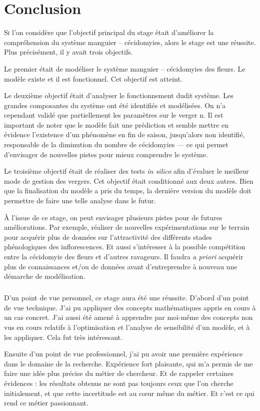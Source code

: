 \chapter{Conclusion} 

\lettrine{S}{i} l'on considère que l'objectif principal du stage était d'améliorer la compréhension du système manguier -- cécidomyies, alors le stage est une réussite.
Plus précisément, il y avait trois objectifs.

Le premier était de modéliser le système manguier -- cécidomyies des fleurs.
Le modèle existe et il est fonctionnel.
Cet objectif est atteint.

Le deuxième objectif était d'analyser le fonctionnement dudit système.
Les grandes composantes du système ont été identifiés et modélisées.
On n'a cependant validé que partiellement les paramètres sur le verger n.
Il est important de noter que le modèle fait une prédiction et semble mettre en évidence l'existence d'un phénomène en fin de saison, jusqu'alors non identifié, responsable de la diminution du nombre de cécidomyies --- ce qui permet d'envisager de nouvelles pistes pour mieux comprendre le système.

Le troisième objectif était de réaliser des tests \emph{in silico} afin d'évaluer le meilleur mode de gestion des vergers.
Cet objectif était conditionné aux deux autres.
Bien que la finalisation du modèle a pris du temps, la dernière version du modèle doit permettre de faire une telle analyse dans le futur.

À l'issue de ce stage, on peut envisager plusieurs pistes pour de futures améliorations.
Par exemple, réaliser de nouvelles expérimentations sur le terrain pour acquérir plus de données sur l'attractivité des différents stades phénologiques des inflorescences.
Et aussi s'intéresser à la possible compétition entre la cécidomyie des fleurs et d'autres ravageurs.
Il faudra \emph{a priori} acquérir plus de connaissances et/ou de données avant d'entreprendre à nouveau une démarche de modélisation.

\paragraph{ } D'un point de vue personnel, ce stage aura été une réussite.
D'abord d'un point de vue technique. J'ai pu appliquer des concepts mathématiques appris en cours à un cas concret.
J'ai aussi été amené à apprendre par moi-même des concepts non vus en cours relatifs à l'optimisation et l'analyse de sensibilité d'un modèle, et à les appliquer. Cela fut très intéressant.

Ensuite d'un point de vue professionnel, j'ai pu avoir une première expérience dans le domaine de la recherche.
Expérience fort plaisante, qui m'a permis de me faire une idée plus précise du métier de chercheur.
Et de rappeler certaines évidences : les résultats obtenus ne sont pas toujours ceux que l'on cherche initialement, et que cette incertitude est au cœur même du métier.
Et c'est ce qui rend ce métier passionnant.
